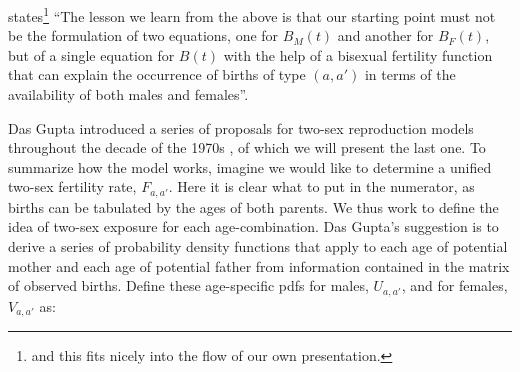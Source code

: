 \FloatBarrier
\label{sec:dasgupta}
\citet{gupta1978alternative} states\footnote{and this fits nicely into the flow
of our own presentation.} ``The lesson we learn from the above is that our
starting point must not be the formulation of two equations, one for $B_M(t)$ and another for
$B_F(t)$, but of a single equation for $B(t)$ with the help of a bisexual
fertility function that can explain the occurrence of births of type $(a,a')$ in
terms of the availability of both males and females''.

Das Gupta introduced a series of proposals for two-sex reproduction models
throughout the decade of the 1970s \citep{gupta1972two, gupta1973us,
gupta1976interactive, gupta1978alternative}, of which we will present the last
one. To summarize how the model works, imagine we would like to determine a
unified two-sex fertility rate, $F_{a,a'}$. Here it is clear
what to put in the numerator, as births can be tabulated by the ages of both parents.
 We thus work to define the idea of two-sex exposure for each age-combination. Das Gupta's
suggestion is to derive a series of probability density functions that apply to
each age of potential mother and each age of potential father from information
contained in the matrix of observed births. Define these age-specific pdfs for
males, $U_{a,a'}$, and for females, $V_{a,a'}$ as:

